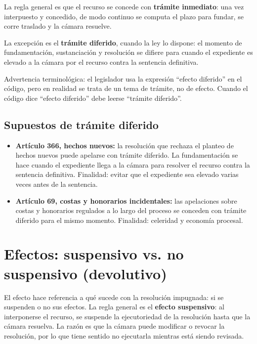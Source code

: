 \documentclass[12pt,oneside]{book}
\begin{document}
La regla general es que el recurso se concede con \textbf{trámite inmediato}: una vez interpuesto y concedido, de modo continuo se computa el plazo para fundar, se corre traslado y la cámara resuelve.

La excepción es el \textbf{trámite diferido}, cuando la ley lo dispone: el momento de fundamentación, sustanciación y resolución se difiere para cuando el expediente es elevado a la cámara por el recurso contra la sentencia definitiva.

\begin{important}
Advertencia terminológica: el legislador usa la expresión ``efecto diferido'' en el código, pero en realidad se trata de un tema de trámite, no de efecto. Cuando el código dice ``efecto diferido'' debe leerse ``trámite diferido''.
\end{important}

\subsection{Supuestos de trámite diferido}

\begin{itemize}
    \item \textbf{Artículo 366, hechos nuevos:} la resolución que rechaza el planteo de hechos nuevos puede apelarse con trámite diferido. La fundamentación se hace cuando el expediente llega a la cámara para resolver el recurso contra la sentencia definitiva. Finalidad: evitar que el expediente sea elevado varias veces antes de la sentencia.
    \item \textbf{Artículo 69, costas y honorarios incidentales:} las apelaciones sobre costas y honorarios regulados a lo largo del proceso se conceden con trámite diferido para el mismo momento. Finalidad: celeridad y economía procesal.
\end{itemize}

\section{Efectos: suspensivo vs. no suspensivo (devolutivo)}

El efecto hace referencia a qué sucede con la resolución impugnada: si se suspenden o no sus efectos. La regla general es el \textbf{efecto suspensivo}: al interponerse el recurso, se suspende la ejecutoriedad de la resolución hasta que la cámara resuelva. La razón es que la cámara puede modificar o revocar la resolución, por lo que tiene sentido no ejecutarla mientras está siendo revisada.
\end{document}
